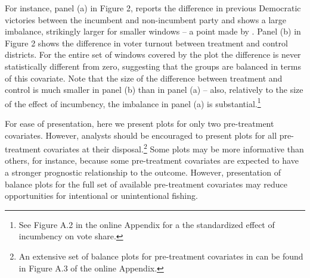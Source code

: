\documentclass[letterpaper,twoside,12pt]{article}\usepackage[]{graphicx}\usepackage[]{color}
\begin{document}
For instance, panel (a) in Figure 2, reports the difference in previous Democratic victories between the incumbent and non-incumbent party and shows a large imbalance, strikingly larger for smaller windows -- a point made by \citet{caughey2011elections}. Panel (b) in Figure 2 shows the difference in voter turnout between treatment and control districts. For the entire set of windows covered by the plot the difference is never statistically different from zero, suggesting that the groups are balanced in terms of this covariate. Note that the size of the difference between treatment and control is much smaller in panel (b) than in panel (a) -- also, relatively to the size of the effect of incumbency, the imbalance in panel (a) is substantial.\footnote{See Figure A.2 in the online Appendix for a the standardized effect of incumbency on vote share.}

For ease of presentation, here we present plots for only two pre-treatment covariates. However, analysts should be encouraged to present plots for all pre-treatment covariates at their disposal.\footnote{An extensive set of balance plots for pre-treatment covariates in \citet{caughey2011elections} can be found in Figure A.3 of the online Appendix.} Some plots may be more informative than others, for instance, because some pre-treatment covariates are expected to have a stronger prognostic relationship to the outcome. However, presentation of balance plots for the full set of available pre-treatment covariates may reduce opportunities for intentional or unintentional fishing.
\end{document}
